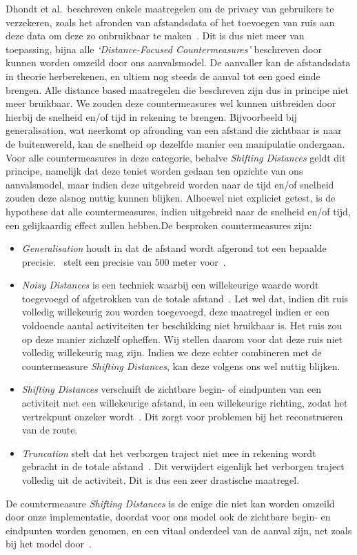 Dhondt et al.\ beschreven enkele maatregelen om de privacy van gebruikers te
verzekeren, zoals het afronden van afstandsdata of het toevoegen van ruis aan
deze data om deze zo onbruikbaar te maken~\cite{Dhondt}. Dit is dus niet meer
van toepassing, bijna alle \textit{`Distance-Focused Countermeasures'}
beschreven door~\citeauthor{Dhondt} kunnen worden omzeild door ons
aanvalsmodel. De aanvaller kan de afstandsdata in theorie herberekenen, en
ultiem nog steeds de aanval tot een goed einde brengen. Alle distance based
maatregelen die \citeauthor{Dhondt} beschreven zijn dus in principe niet meer
bruikbaar. We zouden deze countermeasures wel kunnen uitbreiden door hierbij de
snelheid en/of tijd in rekening te brengen. Bijvoorbeeld bij generalisation,
wat neerkomt op afronding van een afstand die zichtbaar is naar de
buitenwereld, kan de snelheid op dezelfde manier een manipulatie ondergaan.
Voor alle countermeasures in deze categorie, behalve \textit{Shifting
      Distances} geldt dit principe, namelijk dat deze teniet worden gedaan ten
opzichte van ons aanvalsmodel, maar indien deze uitgebreid worden naar de tijd
en/of snelheid zouden deze alsnog nuttig kunnen blijken. Alhoewel niet
expliciet getest, is de hypothese dat alle countermeasures, indien uitgebreid
naar de snelheid en/of tijd, een gelijkaardig effect zullen hebben.De besproken
countermeasures zijn:
\begin{itemize}
      \item \textit{Generalisation} houdt in dat de afstand wordt afgerond tot een bepaalde
            precisie.~\citeauthor{Dhondt} stelt een precisie van 500 meter
            voor~\cite{Dhondt}.
      \item \textit{Noisy Distances} is een techniek waarbij een willekeurige waarde wordt
            toegevoegd of afgetrokken van de totale afstand~\cite{Dhondt}. Let wel dat, indien dit ruis volledig willekeurig zou worden toegevoegd, deze maatregel indien er een
            voldoende aantal activiteiten ter beschikking niet bruikbaar is. Het ruis zou op deze manier zichzelf opheffen. Wij stellen daarom voor dat deze ruis niet volledig willekeurig mag zijn.
            Indien we deze echter combineren met de countermeasure \textit{Shifting Distances}, kan deze volgens ons wel nuttig blijken.
      \item \textit{Shifting Distances} verschuift de zichtbare begin- of eindpunten van een activiteit met een willekeurige afstand, in een willekeurige richting,
            zodat het vertrekpunt onzeker wordt~\cite{Dhondt}. Dit zorgt voor problemen bij het reconstrueren van de route.
      \item \textit{Truncation} stelt dat het verborgen traject niet mee in rekening wordt gebracht in de
            totale afstand~\cite{Dhondt}. Dit verwijdert eigenlijk het verborgen traject volledig uit de activiteit. Dit is dus een zeer drastische maatregel.
\end{itemize}
De countermeasure \textit{Shifting Distances} is de enige die niet kan worden
omzeild door onze implementatie, doordat voor ons model ook de
zichtbare begin- en eindpunten worden genomen, en een vitaal onderdeel van de
aanval zijn, net zoals bij het model door~\citeauthor{Dhondt}.

